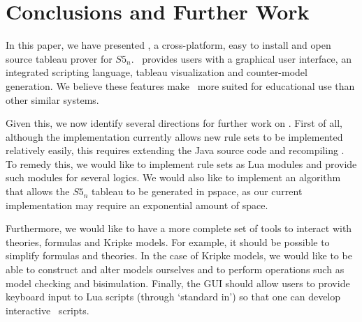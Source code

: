 \section{Conclusions and Further Work}
\label{sec:discussion}

In this paper, we have presented \oops, a cross-platform, easy to install and
open source tableau prover for $S5_n$.
\oops\ provides users with a graphical user interface, an integrated scripting
language, tableau visualization and counter-model generation. 
We believe these features make \oops\ more suited for educational use than
other similar systems.

Given this, we now identify several directions for further work on \oops.
First of all, although the implementation currently allows new rule sets to be
implemented relatively easily, this requires extending the Java source code and
recompiling \oops. To remedy this, we would like to implement rule sets as Lua
modules and provide such modules for several logics. We would also like to
implement an algorithm that allows the $S5_n$ tableau to be generated in
{\sc pspace}, as our current implementation may require an exponential amount of space.

Furthermore, we would like to have a more complete set of tools to interact
with theories, formulas and Kripke models. For example, it should be possible
to simplify formulas and theories. In the case of Kripke models, we would like
to be able to construct and alter models ourselves and to perform operations
such as model checking and bisimulation. Finally, the GUI should allow users
to provide keyboard input to Lua scripts (through `standard in') so that one
can develop interactive \oops\ scripts.
